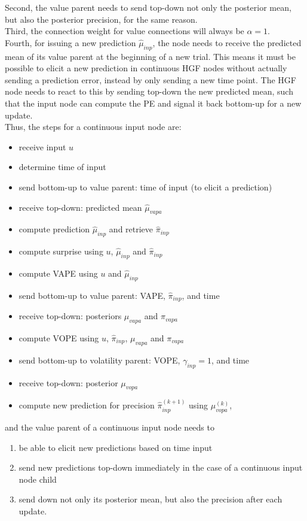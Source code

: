 Second, the value parent needs to send top-down not only the posterior mean, but also the posterior precision, for the same reason.\\

Third, the connection weight for value connections will always be $\alpha = 1$.\\

Fourth, for issuing a new prediction $\hat{\mu}_{inp}$, the node needs to receive the predicted mean of its value parent at the beginning of a new trial. This means it must be possible to elicit a new prediction in continuous HGF nodes without actually sending a prediction error, instead by only sending a new time point. The HGF node needs to react to this by sending top-down the new predicted mean, such that the input node can compute the \textsf{PE} and signal it back bottom-up for a new update.\\

Thus, the steps for a continuous input node are:
\begin{itemize}
    \item receive input $u$
    \item determine time of input
    \item send bottom-up to value parent: time of input (to elicit a prediction)
    \item receive top-down: predicted mean $\hat{\mu}_{vapa}$
    \item compute prediction $\hat{\mu}_{inp}$ and retrieve $\hat{\pi}_{inp}$
    \item compute surprise using $u$, $\hat{\mu}_{inp}$ and $\hat{\pi}_{inp}$
    \item compute \textsf{VAPE} using $u$ and $\hat{\mu}_{inp}$
    \item send bottom-up to value parent: \textsf{VAPE}, $\hat{\pi}_{inp}$, and time
    \item receive top-down: posteriors $\mu_{vapa}$ and $\pi_{vapa}$
    \item compute \textsf{VOPE} using $u$, $\hat{\pi}_{inp}$, $\mu_{vapa}$ and $\pi_{vapa}$
    \item send bottom-up to volatility parent: \textsf{VOPE}, $\gamma_{inp} = 1$, and time
    \item receive top-down: posterior $\mu_{vopa}$
    \item compute new prediction for precision $\hat{\pi}_{inp}^{(k+1)}$ using $\mu_{vopa}^{(k)}$,
\end{itemize}
\noindent
and the value parent of a continuous input node needs to 
\begin{enumerate}
    \item be able to elicit new predictions based on time input
    \item send new predictions top-down immediately in the case of a continuous input node child
    \item send down not only its posterior mean, but also the precision after each update.
\end{enumerate}

